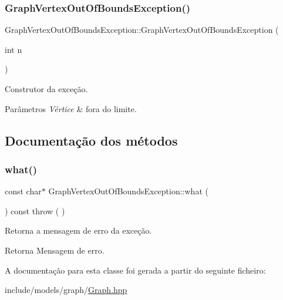 \subsubsection{\texorpdfstring{GraphVertexOutOfBoundsException()}{GraphVertexOutOfBoundsException()}}
{\footnotesize\ttfamily Graph\+Vertex\+Out\+Of\+Bounds\+Exception\+::\+Graph\+Vertex\+Out\+Of\+Bounds\+Exception (\begin{DoxyParamCaption}\item[{int}]{n }\end{DoxyParamCaption})\hspace{0.3cm}{\ttfamily [inline]}}

Construtor da exceção. 
\begin{DoxyParams}{Parâmetros}
{\em Vértice} & fora do limite. \\
\hline
\end{DoxyParams}


\subsection{Documentação dos métodos}
\mbox{\label{classGraphVertexOutOfBoundsException_ac85fc95ea1c178023571adf7a9b8b0df}} 
\subsubsection{\texorpdfstring{what()}{what()}}
{\footnotesize\ttfamily const char$\ast$ Graph\+Vertex\+Out\+Of\+Bounds\+Exception\+::what (\begin{DoxyParamCaption}{ }\end{DoxyParamCaption}) const throw ( ) \hspace{0.3cm}{\ttfamily [inline]}}

Retorna a mensagem de erro da exceção. \begin{DoxyReturn}{Retorna}
Mensagem de erro. 
\end{DoxyReturn}


A documentação para esta classe foi gerada a partir do seguinte ficheiro\+:\begin{DoxyCompactItemize}
\item 
include/models/graph/\mbox{\hyperlink{Graph_8hpp}{Graph.\+hpp}}\end{DoxyCompactItemize}
